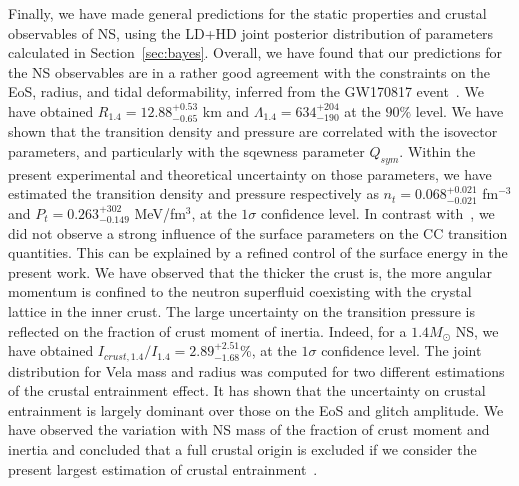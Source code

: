 Finally, we have made general predictions for the static properties and crustal 
observables of NS, using the LD+HD joint posterior distribution of parameters 
calculated in Section~\ref{sec:bayes}. Overall, we have found that our 
predictions for the NS observables are in a rather good agreement with the
constraints on the EoS, radius, and tidal deformability, inferred from the 
GW170817 event~\cite{De2018,GW1}. We have obtained 
$R_{1.4}=12.88_{-0.65}^{+0.53}$ km and $\Lambda_{1.4} = 634_{-190}^{+204}$ at 
the $90\%$ level. 
We have shown that the transition density and pressure are 
correlated with the isovector parameters, and particularly with the sqewness 
parameter $Q_{sym}$. Within the present experimental and theoretical 
uncertainty on those parameters, we have estimated the transition density and
pressure respectively as $n_t=0.068_{-0.021}^{+0.021}$ fm$^{-3}$ and
$P_t=0.263_{-0.149}^{+302}$ MeV/fm$^3$, at the $1\sigma$ confidence level. In
contrast with~\cite{Carreau2019cc}, we did not observe a strong influence of
the surface parameters on the CC transition quantities. This can be explained 
by a refined control of the surface energy in the present work.
We have observed that the thicker the crust is, the more angular momentum is
confined to the neutron superfluid coexisting with the crystal lattice in the
inner crust. The large uncertainty on the transition pressure is reflected on
the fraction of crust moment of inertia. Indeed, for a $1.4M_\odot$ NS, we have 
obtained $I_{crust,1.4}/I_{1.4}=2.89_{-1.68}^{+2.51} \%$, at the $1\sigma$ 
confidence level. The joint distribution for Vela mass and radius was
computed for two different estimations of the crustal entrainment effect. It 
has shown that the uncertainty on crustal entrainment is largely dominant over 
those on the EoS and glitch amplitude. We have observed the variation with NS
mass of the fraction of crust moment and inertia and concluded that a full 
crustal origin is excluded if we consider the present largest estimation of 
crustal entrainment~\cite{Delsate2016}.
